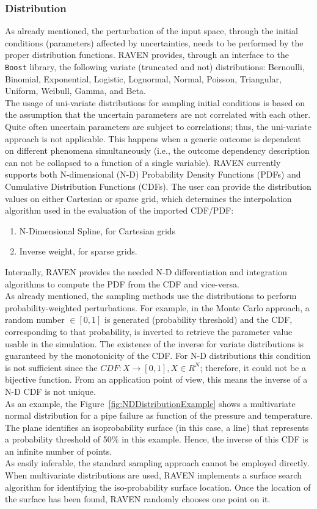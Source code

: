 \subsubsection{Distribution}
As already mentioned, the perturbation of the input space, through the initial conditions (parameters) affected by uncertainties, needs to be performed by the proper distribution functions. RAVEN provides, through an interface to the \texttt{Boost} library, the following variate (truncated and not) distributions: Bernoulli, Binomial, Exponential, Logistic, Lognormal, Normal, Poisson, Triangular, Uniform, Weibull, Gamma, and Beta.
\\The usage of uni-variate distributions for sampling initial conditions is based on the assumption that the uncertain parameters are not correlated with each other. Quite often uncertain parameters are subject to correlations; thus, the uni-variate approach is not applicable. This happens when a generic outcome is dependent on different phenomena simultaneously (i.e., the outcome dependency description can not be collapsed to a function of a single variable). RAVEN currently supports both N-dimensional (N-D) 
Probability Density Functions (PDFs) and Cumulative Distribution Functions (CDFs). The user can provide the distribution values on either Cartesian or sparse grid, which determines the interpolation algorithm used in the evaluation of the imported CDF/PDF:
\begin{enumerate}
\item N-Dimensional Spline, for Cartesian grids
\item Inverse weight, for sparse grids.
\end{enumerate}
Internally, RAVEN provides the needed N-D differentiation and integration algorithms to compute the PDF from the CDF and vice-versa. 
\\As already mentioned, the sampling methods use the distributions to perform probability-weighted perturbations. For example, in the Monte Carlo approach, a random number $\in [0,1]$ is generated (probability threshold) and the CDF, corresponding to that probability, is inverted to retrieve the parameter value usable in the simulation. The existence of the inverse for variate distributions is guaranteed by the monotonicity of the CDF. For N-D distributions this condition is not sufficient since the $CDF:X\longrightarrow [0,1],X \in  R^{N} $;  therefore, it could not be a bijective function. From an application point of view, this means the inverse of a N-D CDF is not unique. 
\\As an example, the Figure~\ref{fig:NDDistributionExample} shows a multivariate normal distribution for a pipe failure as function of the pressure and temperature. The plane identifies an isoprobability surface (in this case, a line) that represents a probability threshold of 50\% in this example.  Hence, the inverse of this CDF is an infinite number of points.
 \\As easily inferable, the standard sampling approach cannot be employed directly. When multivariate distributions are used, RAVEN implements a surface search algorithm for identifying the iso-probability surface location. Once the location of the surface has been found, RAVEN randomly chooses one point on it.


